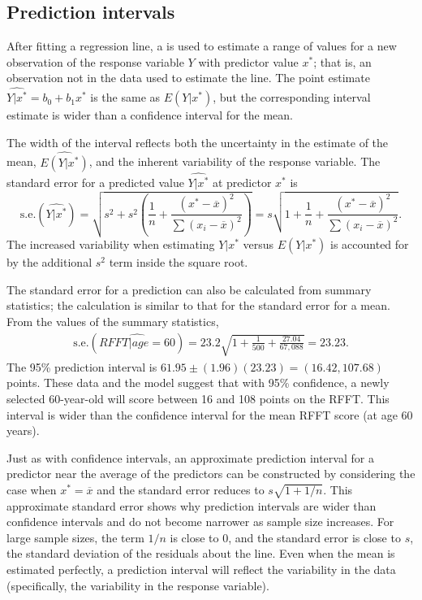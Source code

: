 \textD{\newpage}


\subsection{Prediction intervals}


After fitting a regression line, a  is used to estimate a range of values for a new observation of the response variable $Y$ with predictor value $x^*$; that is, an observation not in the data used to estimate the line. The point estimate $\widehat{Y|x^*} = b_0 + b_1x^*$ is the same as $\widehat{E(Y|x^*)}$, but the corresponding interval estimate is wider than a confidence interval for the mean.

The width of the interval reflects both the uncertainty in the estimate of the mean, $\widehat{E(Y|x^*)}$, and the inherent variability of the response variable.  The standard error for a predicted value $\widehat{Y|x^*}$ at predictor $x^*$ is
\[
  \text{s.e.}(\widehat{Y|x^*}) = \sqrt{s^2 + s^2\left(\frac{1}{n} + \dfrac{(x^*-\overline{x})^2}{\sum(x_i-\overline{x})^2}\right)} = s\sqrt{1 + \frac{1}{n} + \dfrac{(x^*-\overline{x})^2}{\sum(x_i-\overline{x})^2}}.
\]
The increased variability when estimating $Y|x^*$ versus $E(Y|x^*)$ is accounted for by the additional $s^2$ term inside the square root.

The standard error for a prediction can also be calculated from summary statistics; the calculation is similar to that for the standard error for a mean.  From the values of the summary statistics,
\begin{align*}
  \text{s.e.}(\widehat{RFFT|age = 60}) = 23.2 \sqrt{1 +  \frac{1}{500} + \frac{27.04}{67,088}} = 23.23.
\end{align*}
The 95\% prediction interval is $61.95 \pm (1.96)(23.23) = (16.42, 107.68)$ points. These data and the model suggest that with 95\% confidence, a newly selected 60-year-old will score between 16 and 108 points on the RFFT. This interval is wider than the confidence interval for the mean RFFT score (at age 60 years).

Just as with confidence intervals, an approximate prediction interval for a predictor near the average of the predictors can be constructed by considering the case when $x^* = \overline{x}$ and the standard error reduces to $s\sqrt{1 + 1/n}$.  This approximate standard error shows why prediction intervals are wider than confidence intervals and do not become narrower as sample size increases.  For large sample sizes, the term $1/n$ is close to 0, and the standard error is close to $s$, the standard deviation of the residuals about the line.  Even when the mean is estimated perfectly, a prediction interval will reflect the variability in the data (specifically, the variability in the response variable).

